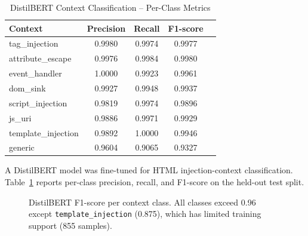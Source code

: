  
\begin{table}[H]
  \centering
 \footnotesize
  \begin{tabular}{lcccc}
    \toprule
    \rowcolor{headblue}
   \textbf{Context} & \textbf{Precision} & \textbf{Recall} & \textbf{F1-score} \\
\midrule
tag\_injection      & 0.9980 & 0.9974 & 0.9977  \\
attribute\_escape   & 0.9976 & 0.9984 & 0.9980  \\
event\_handler      & 1.0000 & 0.9923 & 0.9961 \\
dom\_sink           & 0.9927 & 0.9948 & 0.9937  \\
script\_injection   & 0.9819 & 0.9974 & 0.9896  \\
js\_uri             & 0.9886 & 0.9971 & 0.9929  \\
template\_injection & 0.9892 & 1.0000 & 0.9946  \\
generic             & 0.9604 & 0.9065 & 0.9327  \\
  \end{tabular}
   \caption{DistilBERT Context Classification -- Per-Class Metrics}
  \label{tab:distilbert_clf}
\end{table}
 A DistilBERT model was fine-tuned for HTML injection-context classification. Table~\ref{tab:distilbert_clf} reports per-class precision, recall, and F1-score on the held-out test split.
\begin{figure}[H]
  \centering
  \caption{DistilBERT F1-score per context class. All classes exceed 0.96 except \texttt{template\_injection} (0.875), which has limited training support (855 samples).}
  \label{fig:f1_bar}
\end{figure}

